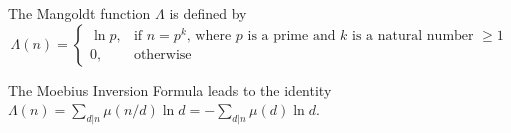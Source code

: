 \documentclass[12pt]{article}
\begin{document}
The Mangoldt function $\Lambda$ is defined by
\[ \Lambda (n) = 
\begin{cases}
\ln p, &\text{if $n=p^k$, where $p$ is a prime and $k$ is a natural number $\geq 1$}\\
0, &\text{otherwise}
\end{cases}
\]

The Moebius Inversion Formula leads to the identity $\Lambda (n) = \sum_{d|n} \mu (n/d) \ln d = - \sum_{d|n} \mu (d) \ln d$.
\end{document}
